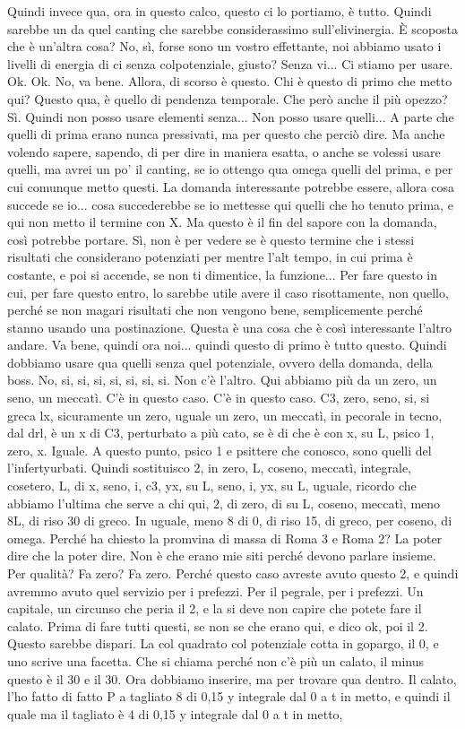 \begin{soluzione}
{   Quindi invece qua, ora in questo calco, questo ci lo portiamo, è tutto. Quindi sarebbe un da quel canting che sarebbe considerassimo sull'elivinergia. È scoposta che è un'altra cosa? No, sì, forse sono un vostro effettante, noi abbiamo usato i livelli di energia di ci senza colpotenziale, giusto? Senza vi... Ci stiamo per usare. Ok. Ok. No, va bene. Allora, di scorso è questo. Chi è questo di primo che metto qui? Questo qua, è quello di pendenza temporale. Che però anche il più opezzo? Sì. Quindi non posso usare elementi senza... Non posso usare quelli... A parte che quelli di prima erano nunca pressivati, ma per questo che perciò dire. Ma anche volendo sapere, sapendo, di per dire in maniera esatta, o anche se volessi usare quelli, ma avrei un po' il canting, se io ottengo qua omega quelli del prima, e per cui comunque metto questi. La domanda interessante potrebbe essere, allora cosa succede se io... cosa succederebbe se io mettesse qui quelli che ho tenuto prima, e qui non metto il termine con X. Ma questo è il fin del sapore con la domanda, così potrebbe portare. Sì, non è per vedere se è questo termine che i stessi risultati che considerano potenziati per mentre l'alt tempo, in cui prima è costante, e poi si accende, se non ti dimentice, la funzione... Per fare questo in cui, per fare questo entro, lo sarebbe utile avere il caso risottamente, non quello, perché se non magari risultati che non vengono bene, semplicemente perché stanno usando una postinazione. Questa è una cosa che è così interessante l'altro andare. Va bene, quindi ora noi... quindi questo di primo è tutto questo. Quindi dobbiamo usare qua quelli senza quel potenziale, ovvero della domanda, della boss. No, si, si, si, si, si, si, si. Non c'è l'altro. Qui abbiamo più da un zero, un seno, un meccatì. C'è in questo caso. C'è in questo caso. C3, zero, seno, si, si greca lx, sicuramente un zero, uguale un zero, un meccatì, in pecorale in tecno, dal drl, è un x di C3, perturbato a più cato, se è di che è con x, su L, psico 1, zero, x. Iguale. A questo punto, psico 1 e psittere che conosco, sono quelli del l'infertyurbati. Quindi sostituisco 2, in zero, L, coseno, meccatì, integrale, cosetero, L, di x, seno, i, c3, yx, su L, seno, i, yx, su L, uguale, ricordo che abbiamo l'ultima che serve a chi qui, 2, di zero, di su L, coseno, meccatì, meno 8L, di riso 30 di greco. In uguale, meno 8 di 0, di riso 15, di greco, per coseno, di omega. Perché ha chiesto la promvina di massa di Roma 3 e Roma 2? La poter dire che la poter dire. Non è che erano mie siti perché devono parlare insieme. Per qualità? Fa zero? Fa zero. Perché questo caso avreste avuto questo 2, e quindi avremmo avuto quel servizio per i prefezzi. Per il pegrale, per i prefezzi. Un capitale, un circunso che peria il 2, e la si deve non capire che potete fare il calato. Prima di fare tutti questi, se non se che erano qui, e dico ok, poi il 2. Questo sarebbe dispari. La col quadrato col potenziale cotta in gopargo, il 0, e uno scrive una facetta. Che si chiama perché non c'è più un calato, il minus questo è il 30 e il 30. Ora dobbiamo inserire, ma per trovare qua dentro. Il calato, l'ho fatto di fatto P a tagliato 8 di 0,15 y integrale dal 0 a t in metto, e quindi il quale ma il tagliato è 4 di 0,15 y integrale dal 0 a t in metto, }
\end{soluzione}
